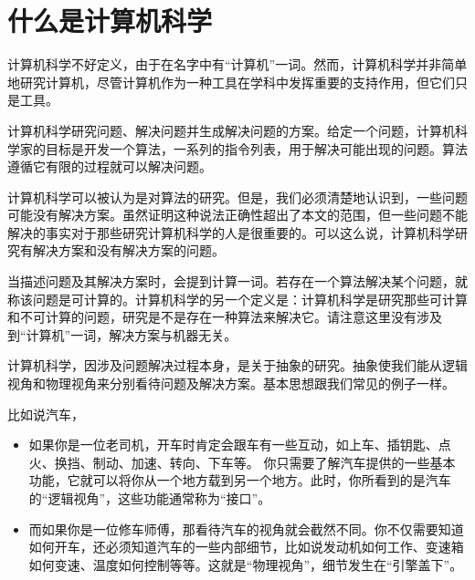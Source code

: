 \section{什么是计算机科学}

\begin{frame}\ft{\secname}
计算机科学不好定义，由于在名字中有“计算机”一词。然而，计算机科学并非简单地研究计算机，尽管计算机作为一种工具在学科中发挥重要的支持作用，但它们只是工具。
\end{frame}

\begin{frame}\ft{\secname}
计算机科学研究问题、解决问题并生成解决问题的方案。给定一个问题，计算机科学家的目标是开发一个算法，一系列的指令列表，用于解决可能出现的问题。算法遵循它有限的过程就可以解决问题。
\end{frame}

\begin{frame}\ft{\secname}
计算机科学可以被认为是对算法的研究。但是，我们必须清楚地认识到，一些问题可能没有解决方案。虽然证明这种说法正确性超出了本文的范围，但一些问题不能解决的事实对于那些研究计算机科学的人是很重要的。可以这么说，计算机科学研究有解决方案和没有解决方案的问题。
\end{frame}

\begin{frame}\ft{\secname}
当描述问题及其解决方案时，会提到计算一词。若存在一个算法解决某个问题，就称该问题是可计算的。计算机科学的另一个定义是：计算机科学是研究那些可计算和不可计算的问题，研究是不是存在一种算法来解决它。请注意这里没有涉及到“计算机”一词，解决方案与机器无关。
\end{frame}

\begin{frame}\ft{\secname}
计算机科学，因涉及问题解决过程本身，是关于抽象的研究。抽象使我们能从逻辑视角和物理视角来分别看待问题及解决方案。基本思想跟我们常见的例子一样。
\end{frame}

\begin{frame}\ft{\secname}
  比如说汽车，
  \begin{itemize}
  \item   如果你是一位老司机，开车时肯定会跟车有一些互动，如上车、插钥匙、点火、换挡、制动、加速、转向、下车等。
    你只需要了解汽车提供的一些基本功能，它就可以将你从一个地方载到另一个地方。此时，你所看到的是汽车的“逻辑视角”，这些功能通常称为“接口”。
  
  \item 而如果你是一位修车师傅，那看待汽车的视角就会截然不同。你不仅需要知道如何开车，还必须知道汽车的一些内部细节，比如说发动机如何工作、变速箱如何变速、温度如何控制等等。这就是“物理视角”，细节发生在“引擎盖下”。
    
  \end{itemize}
\end{frame}


